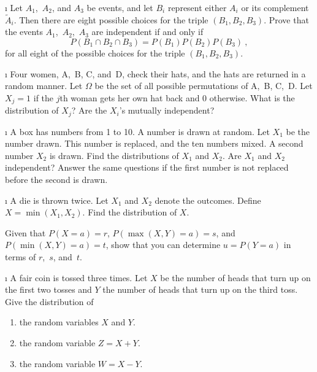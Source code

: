 \begin{LJSItem}


\i\label{exer 4.1.31} Let $A_1$,~$A_2$, and $A_3$ be events, and let $B_i$ represent
either $A_i$ or its complement $\tilde A_i$.  Then there are eight possible choices for the
triple $(B_1, B_2, B_3)$.  Prove that the events $A_1$,~$A_2$,~$A_3$ are independent if and
only if $$P(B_1 \cap B_2 \cap B_3) = P(B_1)P(B_2)P(B_3)\ ,$$
for all eight of the possible choices for the triple $(B_1, B_2, B_3)$.

\i\label{exer 5.1.4} Four women, A,~B, C, and~D, check their hats, and the hats are returned
in a random manner.  Let $\Omega$ be the set of all possible permutations of A,~B, C,~D.  Let
$X_j = 1$ if the $j$th woman gets her own hat back and 0 otherwise.  What is the
distribution of $X_j$?  Are the $X_i$'s mutually independent?

\i\label{exer 5.1.5} A box has numbers from 1 to 10.  A number is drawn at random.  Let
$X_1$ be the number drawn.  This number is replaced, and the ten numbers mixed.  A second
number $X_2$ is drawn.  Find the distributions of $X_1$ and $X_2$.  Are
$X_1$ and $X_2$ independent?  Answer the same questions if the first number is not replaced
before the second is drawn.

\i\label{exer 5.1.6} A die is thrown twice.  Let $X_1$ and $X_2$ denote the outcomes. 
Define $X = \min(X_1, X_2)$.  Find the distribution of $X$.

\istar\label{exer 5.1.7} \begin{sloppypar} Given that $P(X = a) = r$, $P(\max(X,Y) = a) = s$,
and  
$P(\min(X,Y) = a) = t$, show that you can determine $u = P(Y = a)$ in terms of $r$,~$s$,
and~$t$.\end{sloppypar}

\i\label{exer 5.1.8} A fair coin is tossed three times.  Let $X$ be the number of heads that
turn up on the first two tosses and $Y$ the number of heads that turn up on the third toss. 
Give the distribution of
\begin{enumerate}
\item the random variables $X$ and $Y$.

\item the random variable $Z = X + Y$.

\item the random variable $W = X - Y$.
\end{enumerate}


\end{LJSItem}
